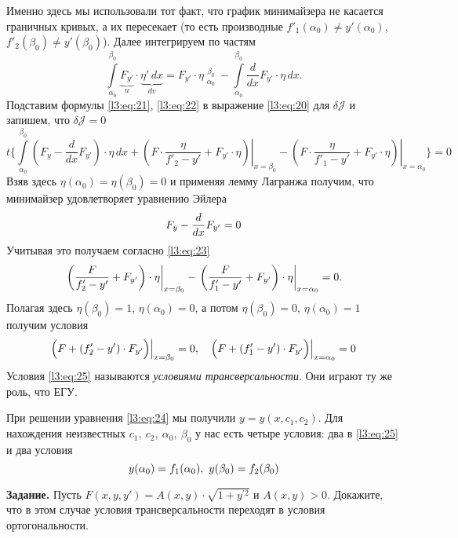 \documentclass[12pt,a4paper,openany,fleqn]{book}
\newcommand{\J}{\ensuremath{\mathcal{J}}}
\newcommand{\der}[2]{\ensuremath{\frac{d#1}{d#2}}}
\theoremstyle{definition}
\begin{document}
Именно здесь мы использовали тот факт, что график минимайзера не касается граничных кривых, а их пересекает (то есть производные $f'_1(\alpha_0)\neq y'(\alpha_0)$,\ $f'_2(\beta_0)\neq y'(\beta_0)$). Далее интегрируем по частям 
\begin{equation}
	\label{l3:eq:22}
	\int\limits_{\alpha_0}^{\beta_0}\underbrace{F_{y'}}_{u}\cdot\underbrace{\eta'\,dx}_{dv}=F_{y'}\cdot\eta\mathop{\Big|}\limits_{\alpha_0}^{\beta_0}-\int\limits_{\alpha_0}^{\beta_0}\der{}{x}F_{y'}\cdot\eta\,dx.
\end{equation}
Подставим формулы \eqref{l3:eq:21}, \eqref{l3:eq:22} в выражение \eqref{l3:eq:20} для $\delta\J$ и запишем, что $\delta\J=0$
\begin{equation}
	\label{l3:eq:23}
	t\Bigg\{\int\limits_{\alpha_0}^{\beta_0}\left(F_{y}-\der{}{x}F_{y'}\right)\cdot\eta\,dx+\left.\left(F\cdot\frac{\eta}{f'_2-y'}+F_{y'}\cdot\eta\right)\right|_{x=\beta_0}-\left.\left(F\cdot\frac{\eta}{f'_1-y'}+F_{y'}\cdot\eta\right)\right|_{x=\alpha_0}\Bigg\}=0
\end{equation}
Взяв здесь $\eta(\alpha_0)=\eta(\beta_0)=0$ и применяя лемму Лагранжа получим, что минимайзер удовлетворяет уравнению Эйлера 
\begin{equation}
	\label{l3:eq:24}
	\hfill F_{y}-\der{}{x}F_{y'}=0\hfill
\end{equation}
Учитывая это получаем согласно \eqref{l3:eq:23} 
\begin{equation*}
	\hfill\left.\left(\frac{F}{f'_2-y'}+F_{y'}\right)\cdot\eta\right|_{x=\beta_0}-\left.\left(\frac{F}{f'_1-y'}+F_{y'}\right)\cdot\eta\right|_{x=\alpha_0}=0.\hfill
\end{equation*}
Полагая здесь $\eta(\beta_0)=1$, $\eta(\alpha_0)=0$, а потом $\eta(\beta_0)=0$, $\eta(\alpha_0)=1$ получим условия
\begin{equation}
	\label{l3:eq:25}
	\hfill \Big(F+(f'_2-y')\cdot F_{y'}\Big)\Big|_{x=\beta_0}=0,\quad \Big(F+(f'_1-y')\cdot F_{y'}\Big)\Big|_{x=\alpha_0}=0\hfill
\end{equation}
Условия \eqref{l3:eq:25} называются \emph{условиями трансверсальности}. Они играют ту же роль, что ЕГУ.

При решении уравнения \eqref{l3:eq:24} мы получили $y=y(x,c_1,c_2)$. Для нахождения неизвестных $c_1,\ c_2,\ \alpha_0,\ \beta_0$ у нас есть четыре условия: два в \eqref{l3:eq:25} и два условия
\begin{equation*}
	\hfill y(\alpha_0)=f_1(\alpha_0),\ y(\beta_0)=f_2(\beta_0)\hfill
\end{equation*}
\vspace{0.2cm}

\noindent\textbf{Задание. }Пусть $F(x,y,y')=A(x,y)\cdot\sqrt{1+y^{\prime2}}$ и $A(x,y)>0$. Докажите, что в этом случае условия трансверсальности переходят в условия ортогональности. 
\end{document}
